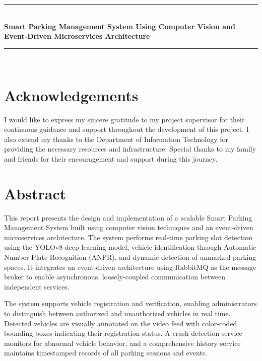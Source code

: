 \documentclass[12pt,a4paper]{report}
\begin{document}
\begin{titlepage}
\centering

\vspace*{3cm}

\rule{\textwidth}{1.5pt}\\[0.6cm]
{\Huge\bfseries Smart Parking Management System Using Computer Vision and Event-Driven Microservices Architecture\\}
\rule{\textwidth}{1.5pt}\\[2.5cm]

\vfill

\end{titlepage}
\newpage

\chapter*{Acknowledgements}

I would like to express my sincere gratitude to my project supervisor for their continuous guidance and support throughout the development of this project. I also extend my thanks to the Department of Information Technology for providing the necessary resources and infrastructure. Special thanks to my family and friends for their encouragement and support during this journey.

\newpage

\chapter*{Abstract}

This report presents the design and implementation of a scalable Smart Parking Management System built using computer vision techniques and an event-driven microservices architecture. The system performs real-time parking slot detection using the YOLOv8 deep learning model, vehicle identification through Automatic Number Plate Recognition (ANPR), and dynamic detection of unmarked parking spaces. It integrates an event-driven architecture using RabbitMQ as the message broker to enable asynchronous, loosely-coupled communication between independent services.

The system supports vehicle registration and verification, enabling administrators to distinguish between authorized and unauthorized vehicles in real time. Detected vehicles are visually annotated on the video feed with color-coded bounding boxes indicating their registration status. A crash detection service monitors for abnormal vehicle behavior, and a comprehensive history service maintains timestamped records of all parking sessions and events.
\end{document}
